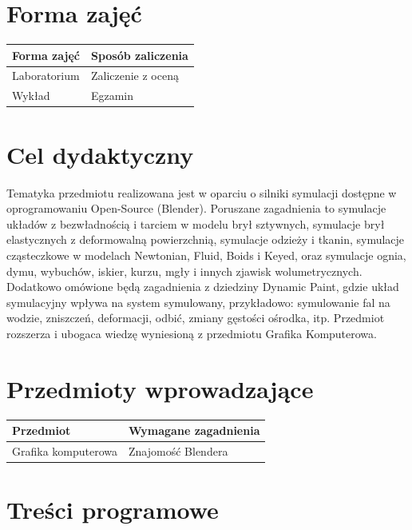 \documentclass[12pt, a4paper]{article}
\begin{document}
\section{Forma zajęć}

\begin{tabular}{ll}
  \hline
  \textbf{Forma zajęć} & \textbf{Sposób zaliczenia} \\
  \hline
  Laboratorium & Zaliczenie z oceną \\
  Wykład & Egzamin \\
  \hline
\end{tabular}

\section{Cel dydaktyczny}

Tematyka przedmiotu realizowana jest w oparciu o silniki symulacji dostępne w oprogramowaniu Open-Source (Blender). Poruszane zagadnienia to symulacje układów z bezwładnością i tarciem w modelu brył sztywnych, symulacje brył elastycznych z deformowalną powierzchnią, symulacje odzieży i tkanin, symulacje cząsteczkowe w modelach Newtonian, Fluid, Boids i Keyed, oraz symulacje ognia, dymu, wybuchów, iskier, kurzu, mgły i innych zjawisk wolumetrycznych. Dodatkowo omówione będą zagadnienia z dziedziny Dynamic Paint, gdzie układ symulacyjny wpływa na system symulowany, przykładowo: symulowanie fal na wodzie, zniszczeń, deformacji, odbić, zmiany gęstości ośrodka, itp. Przedmiot rozszerza i ubogaca wiedzę wyniesioną z przedmiotu Grafika Komputerowa.

\section{Przedmioty wprowadzające}

\begin{tabularx}{\textwidth}{lX}
  \hline
  \textbf{Przedmiot} & \textbf{Wymagane zagadnienia} \\
  \hline
  Grafika komputerowa & Znajomość Blendera \\
  \hline
\end{tabularx}

\section{Treści programowe}
\end{document}
